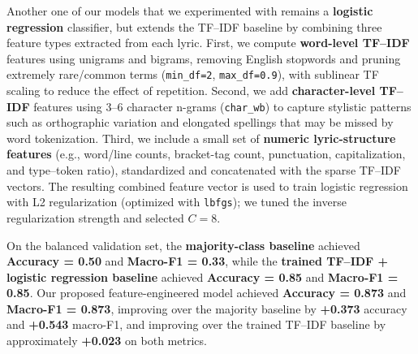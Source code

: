 Another one of our models that we experimented with remains a \textbf{logistic regression} classifier, but extends the TF--IDF baseline by combining three feature types extracted from each lyric. First, we compute \textbf{word-level TF--IDF} features using unigrams and bigrams, removing English stopwords and pruning extremely rare/common terms (\texttt{min\_df=2}, \texttt{max\_df=0.9}), with sublinear TF scaling to reduce the effect of repetition. Second, we add \textbf{character-level TF--IDF} features using 3--6 character n-grams (\texttt{char\_wb}) to capture stylistic patterns such as orthographic variation and elongated spellings that may be missed by word tokenization. Third, we include a small set of \textbf{numeric lyric-structure features} (e.g., word/line counts, bracket-tag count, punctuation, capitalization, and type--token ratio), standardized and concatenated with the sparse TF--IDF vectors. The resulting combined feature vector is used to train logistic regression with L2 regularization (optimized with \texttt{lbfgs}); we tuned the inverse regularization strength and selected $C=8$.

On the balanced validation set, the \textbf{majority-class baseline} achieved \textbf{Accuracy = 0.50} and \textbf{Macro-F1 = 0.33}, while the \textbf{trained TF--IDF + logistic regression baseline} achieved \textbf{Accuracy = 0.85} and \textbf{Macro-F1 = 0.85}. Our proposed feature-engineered model achieved \textbf{Accuracy = 0.873} and \textbf{Macro-F1 = 0.873}, improving over the majority baseline by \textbf{+0.373} accuracy and \textbf{+0.543} macro-F1, and improving over the trained TF--IDF baseline by approximately \textbf{+0.023} on both metrics.